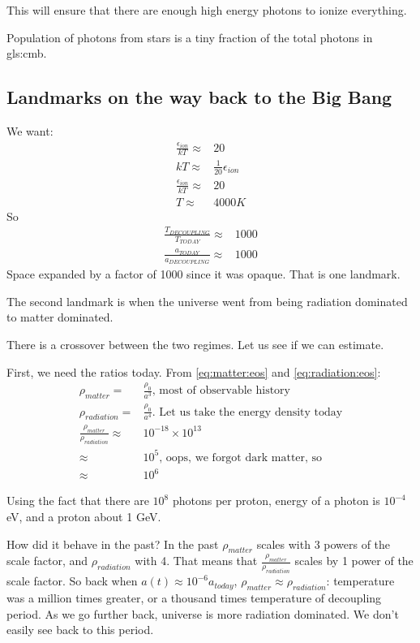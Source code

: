 \documentclass[]{article}
\begin{document}
This will ensure that there are enough high energy photons to ionize everything.

Population of photons from stars is a tiny fraction of the total photons in \glsdesc{gls:cmb}.

\subsection{Landmarks on the way back to the Big Bang}

We want:
\begin{align*}
	\frac{\epsilon_{ion}}{kT}\approx&20\\
	kT \approx& \frac{1}{20}\epsilon_{ion}\\
	\frac{\epsilon_{ion}}{kT} \approx& 20\\
	T \approx & 4000K
\end{align*}
So
\begin{align*}
	\frac{T_{DECOUPLING}}{T_{TODAY}} \approx & 1000\\
	\frac{a_{TODAY}}{a_{DECOUPLING}}  \approx & 1000
\end{align*}
Space expanded by a factor of 1000 since it was opaque. That is one landmark.

The second landmark is when the universe went from being radiation dominated to matter dominated.

There is a crossover between the two regimes. Let us see if we can estimate.

First, we need the ratios today. From \eqref{eq:matter:eos} and \eqref{eq:radiation:eos}:
\begin{align*}
	\rho_{matter} =& \frac{\rho_0}{a^3} \text{, most of observable history}\\
	\rho_{radiation}=& \frac{\rho_0}{a^4} \text{. Let us take the energy density today}\\
	\frac{\rho_{matter}}{\rho_{radiation}} \approx& 10^{-18} \times 10^{13}\\
	\approx& 10^5 \text{, oops, we forgot dark matter, so}\\
	\approx& 10^6
\end{align*}
 
Using the fact that there are $10^8$ photons per proton, energy of a photon is $10^{-4}$ eV, and a proton about 1 GeV. 

How did it behave in the past? In the past $\rho_{matter}$ scales with 3 powers of the scale factor, and $\rho_{radiation}$ with 4. That means that $\frac{\rho_{matter}}{\rho_{radiation}}$ scales by 1 power of the scale factor. So back when $a(t) \approx 10^{-6}a_{today}$, $\rho_{matter}\approx\rho_{radiation}$: temperature was a million times greater, or a thousand times temperature of decoupling period. As we go further back, universe is more radiation dominated. We don't easily see back to this period.
\end{document}
